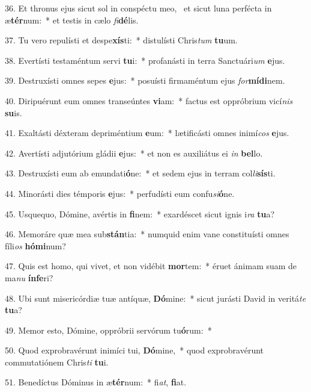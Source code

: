 36. Et thronus ejus sicut sol in conspéctu meo, \dag\  et sicut luna perfécta in æ\textbf{tér}num:~*  et testis in cælo \textit{fi}\textbf{dé}lis.\

37. Tu vero repulísti et despe\textbf{xís}ti:~*  distulísti Chris\textit{tum} \textbf{tu}um.\

38. Evertísti testaméntum servi \textbf{tu}i:~*  profanásti in terra Sanctuári\textit{um} \textbf{e}jus.\

39. Destruxísti omnes sepes \textbf{e}jus:~*  posuísti firmaméntum ejus \textit{for}\textbf{mí}\textbf{di}nem.\

40. Diripuérunt eum omnes transeúntes \textbf{vi}am:~*  factus est oppróbrium vicí\textit{nis} \textbf{su}is.\

41. Exaltásti déxteram depriméntium \textbf{e}um:~*  lætificásti omnes inimí\textit{cos} \textbf{e}jus.\

42. Avertísti adjutórium gládii \textbf{e}jus:~*  et non es auxiliátus ei \textit{in} \textbf{bel}lo.\

43. Destruxísti eum ab emundati\textbf{ó}ne:~*  et sedem ejus in terram col\textit{li}\textbf{sís}ti.\

44. Minorásti dies témporis \textbf{e}jus:~*  perfudísti eum confu\textit{si}\textbf{ó}ne.\

45. Usquequo, Dómine, avértis in \textbf{fi}nem:~*  exardéscet sicut ignis i\textit{ra} \textbf{tu}a?\

46. Memoráre quæ mea sub\textbf{stán}tia:~*  numquid enim vane constituísti omnes fíli\textit{os} \textbf{hó}\textbf{mi}num?\

47. Quis est homo, qui vivet, et non vidébit \textbf{mor}tem:~*  éruet ánimam suam de ma\textit{nu} \textbf{ín}\textbf{fe}ri?\

48. Ubi sunt misericórdiæ tuæ antíquæ, \textbf{Dó}mine:~*  sicut jurásti David in veritá\textit{te} \textbf{tu}a?\

49. Memor esto, Dómine, oppróbrii servórum tu\textbf{ó}rum:~*  \

50. Quod exprobravérunt inimíci tui, \textbf{Dó}mine,~*  quod exprobravérunt commutatiónem Chris\textit{ti} \textbf{tu}i.\

51. Benedíctus Dóminus in æ\textbf{tér}num:~*  fi\textit{at}, \textbf{fi}at.\

